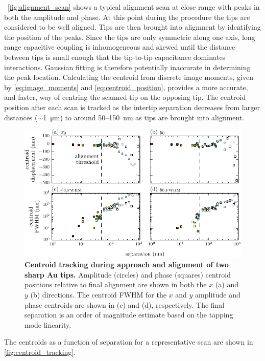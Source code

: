 \documentclass{article}
\begin{document}
\figurename~\ref{fig:alignment_scan} shows a typical alignment scan at close range with peaks in both the amplitude and phase. At this point during the procedure the tips are considered to be well aligned. Tips are then brought into alignment by identifying the position of the peaks. Since the tips are only symmetric along one axis, long range capacitive coupling is inhomogeneous and skewed until the distance between tips is small enough that the tip-to-tip capacitance dominates interactions. Gaussian fitting is therefore potentially inaccurate in determining the peak location. Calculating the centroid from discrete image moments, given by \eqref{eq:image_moments} and \eqref{eq:centroid_position}, provides a more accurate, and faster, way of centring the scanned tip on the opposing tip. The centroid position after each scan is tracked as the intertip separation decreases from larger distances ($\sim$\SI{1}{\micro\metre}) to around 50--\SI{150}{nm} as tips are brought into alignment.
\begin{figure}[bt]
\centering
\includegraphics{figures/centroid_tracking}
\caption[Centroid tracking during approach and alignment of two sharp Au tips]{\textbf{Centroid tracking during approach and alignment of two sharp Au tips.} Amplitude (circles) and phase (squares) centroid positions relative to final alignment are shown in both the $x$ (a) and $y$ (b) directions. The centroid FWHM for the $x$ and $y$ amplitude and phase centroids are shown in (c) and (d), respectively. The final separation is an order of magnitude estimate based on the tapping mode linearity.}
\label{fig:centroid_tracking}
\end{figure}
The centroids as a function of separation for a representative scan are shown in \autoref{fig:centroid_tracking}.
\end{document}
